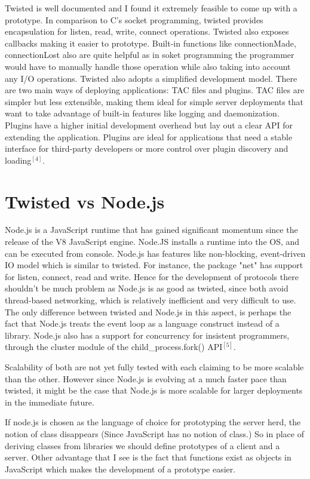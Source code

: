 \documentclass[letterpaper,twocolumn,10pt]{article}
\begin{document}
Twisted is well documented and I found it extremely feasible to come up with a prototype.
In comparison to C's socket programming, twisted provides encapsulation for listen, read, write, connect operations. Twisted also exposes callbacks making it easier to prototype. 
Built-in functions like connectionMade, connectionLost also are quite helpful as in soket programming the programmer would have to manually handle those operation while also taking into account any I/O operations.
Twisted also adopts a simplified development model. There are two main ways of deploying applications: TAC files and plugins. TAC files are simpler but less extensible, making them ideal for simple server deployments that want to take advantage of built-in features like logging and daemonization. Plugins have a higher initial development overhead but lay out a clear API for extending the application. Plugins are ideal for applications that need a stable interface for third-party developers or more control over plugin discovery and loading$^{[4]}$.

\section{Twisted vs Node.js}

Node.js is a JavaScript runtime that has gained significant momentum since the release of the V8 JavaScript engine. Node.JS installs a runtime into the OS, and can be executed from console. Node.js has features like non-blocking, event-driven  IO model which is similar to twisted. For instance, the package "net" has support for listen, connect, read and write. Hence for the development of protocols there shouldn't be much problem as Node.js is as good as twisted, since both avoid thread-based networking, which is relatively inefficient and very difficult to use. The only difference between twisted and Node.js in this aspect, is perhaps the fact that Node.js treats the event loop as a language construct instead of a library.
Node.js also has a support for concurrency for insistent programmers, 	through the cluster module of the child\_process.fork() API$^{[5]}$.

Scalability of both are not yet fully tested with each claiming to be more scalable than the other. However since Node.js is evolving at a much faster pace than twisted, it might be the case that Node.js is more scalable for larger deployments in the immediate future.

If node.js is chosen as the language of choice for prototyping the server herd, the notion of class disappears (Since JavaScript has no notion of class.) So in place of deriving classes from libraries we should define prototypes  of a client and a server. Other advantage that I see is the fact that functions exist as objects in JavaScript which makes the development of a prototype easier.
\end{document}

